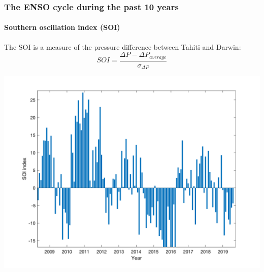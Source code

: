 \documentclass[10pt,t]{beamer}
\begin{document}
\begin{frame}
  \frametitle{The ENSO cycle during the past 10 years}
  \framesubtitle{ Southern oscillation index (SOI)} 

The SOI is a measure of the pressure difference between Tahiti and Darwin:
$$ 
SOI =  \frac{\Delta P - \Delta P_{average}}{\sigma_{\Delta P}}
$$

\begin{centering}
\includegraphics[width=0.75\linewidth]{./figures/soi_index_updated.png}
\end{centering}
\end{frame}

\end{document}
